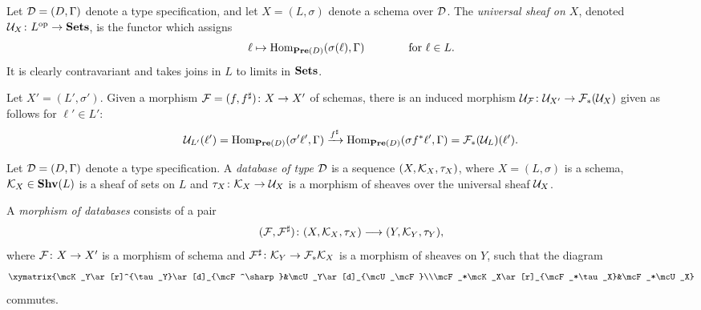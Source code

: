 \documentclass{amsart}
\begin{document}
\begin{definition}

Let $\mathcal{D}=(D,\Gamma)$ denote a type specification, and let $X=(L,\sigma)$ denote a schema over $\mathcal{D}$.  The {\em universal sheaf on $X$}, denoted $\mathcal{U}_X\colon L^\textnormal{op}\rightarrow{\bf Sets}$, is the functor which assigns $$\ell\mapsto\textnormal{Hom}_{{\bf Pre}(D)}(\sigma(\ell),\Gamma) \hspace{.5in} \textnormal{ for } \ell\in L.$$   It is clearly contravariant and takes joins in $L$ to limits in ${\bf Sets}$.  

Let $X'=(L',\sigma')$.  Given a morphism $\mathcal{F}=(f,f^\sharp)\colon X\rightarrow X'$ of schemas, there is an induced morphism $\mathcal{U}_\mathcal{F}\colon\mathcal{U}_{X'}\rightarrow\mathcal{F}_*(\mathcal{U}_X)$ given as follows for $\ell'\in L'$: $$\mathcal{U}_{L'}(\ell')=\textnormal{Hom}_{{\bf Pre}(D)}(\sigma'\ell',\Gamma)\xrightarrow{f^\sharp}\textnormal{Hom}_{{\bf Pre}(D)}(\sigma f^*\ell',\Gamma)=\mathcal{F}_*(\mathcal{U}_L)(\ell').$$

\end{definition}

\begin{definition}

Let $\mathcal{D}=(D,\Gamma)$ denote a type specification.  A {\em database of type $\mathcal{D}$} is a sequence $(X,\mathcal{K}_X,\tau_X)$, where $X=(L,\sigma)$ is a schema, $\mathcal{K}_X\in{\bf Shv}(L)$ is a sheaf of sets on $L$ and $\tau_X\colon\mathcal{K}_X\rightarrow\mathcal{U}_X$ is a morphism of sheaves over the universal sheaf $\mathcal{U}_X$.

A {\em morphism of databases} consists of a pair $$(\mathcal{F},\mathcal{F}^\sharp)\colon(X,\mathcal{K}_X,\tau_X)\longrightarrow(Y,\mathcal{K}_Y,\tau_Y),$$ where $\mathcal{F}\colon X\rightarrow X'$ is a morphism of schema and $\mathcal{F}^\sharp\colon \mathcal{K}_Y\rightarrow\mathcal{F}_*\mathcal{K}_X$ is a morphism of sheaves on $Y$, such that the diagram $$\xymatrix{\mcK_Y\ar[r]^{\tau_Y}\ar[d]_{\mcF^\sharp}&\mcU_Y\ar[d]_{\mcU_\mcF}\\\mcF_*\mcK_X\ar[r]_{\mcF_*\tau_X}&\mcF_*\mcU_X}$$ commutes.

\end{definition}



\end{document}
